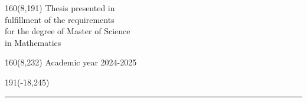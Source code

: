 %
\begin{textblock}{160}(8,191)
  \textblockcolour{}
  \vspace{-\parskip}
  \flushright
  Thesis presented in\\[4.5pt]
  fulfillment of the requirements\\[4.5pt]
  for the degree of Master of Science\\[4.5pt]
  in Mathematics\\
\end{textblock}
%
\begin{textblock}{160}(8,232)
  \textblockcolour{}
  \vspace{-\parskip}
  \flushright
  Academic year 2024-2025
\end{textblock}
%
\begin{textblock}{191}(-18,245)
  {\color{blueline}\rule{550pt}{5.5pt}}
\end{textblock}
%
\vfill
\newpage
